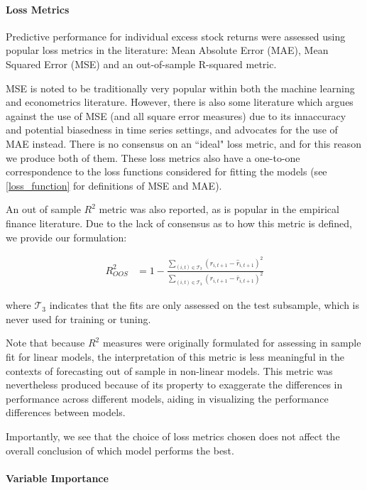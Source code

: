 \documentclass[11pt, a4paper, table]{article}
\begin{document}
\paragraph{Loss Metrics}

Predictive performance for individual excess stock returns were assessed using popular loss metrics in the literature: Mean Absolute Error (MAE), Mean Squared Error (MSE) and an out-of-sample R-squared metric.

MSE is noted to be traditionally very popular within both the machine learning and econometrics literature. However, there is also some literature which argues against the use of MSE (and all square error measures) due to its innaccuracy and potential biasedness in time series settings, and advocates for the use of MAE instead. There is no consensus on an ``ideal" loss metric, and for this reason we produce both of them. These loss metrics also have a one-to-one correspondence to the loss functions considered for fitting the models (see \ref{loss_function} for definitions of MSE and MAE).

An out of sample $R^2$ metric was also reported, as is popular in the empirical finance literature. Due to the lack of consensus as to how this metric is defined, we provide our formulation: 

\begin{align}
R^2_{OOS} &= 1 - \frac{\sum_{(i, t)\in\mathcal{T}_3}(r_{i, t+1} - \widehat{r}_{i, t+1})^2}
{\sum_{(i, t)\in\mathcal{T}_3} \left( r_{i, t+1} - \bar{r}_{i, t+1} \right) ^2}
\end{align}

where $\mathcal{T}_3$ indicates that the fits are only assessed on the test subsample, which is never used for training or tuning.

Note that because $R^2$ measures were originally formulated for assessing in sample fit for linear models, the interpretation of this metric is less meaningful in the contexts of forecasting out of sample in non-linear models. This metric was nevertheless produced because of its property to exaggerate the differences in performance across different models, aiding in visualizing the performance differences between models.

Importantly, we see that the choice of loss metrics chosen does not affect the overall conclusion of which model performs the best.

\paragraph{Variable Importance}
\end{document}
